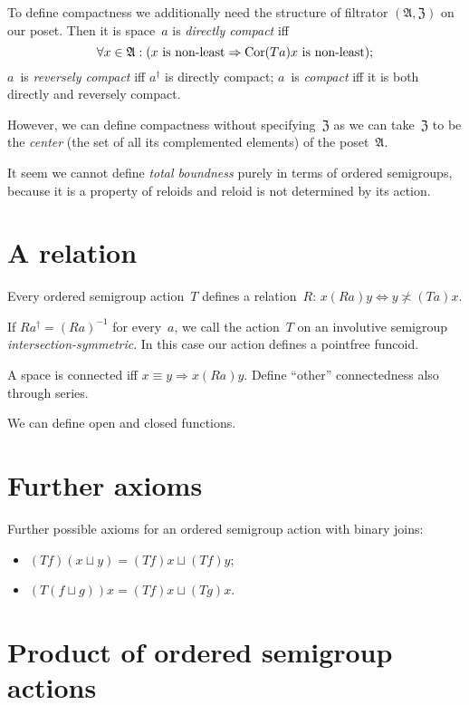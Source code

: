 To define compactness we additionally need the structure of filtrator $(\mathfrak{A},\mathfrak{Z})$ on our poset. Then it is space~$a$ is \emph{directly compact} iff
\[\forall x\in\mathfrak{A}:(x\text{ is non-least}\Rightarrow\operatorname{Cor}(Ta)x\text{ is non-least}); \]
$a$~is \emph{reversely compact} iff $a^{\dagger}$ is directly compact; $a$~is \emph{compact} iff it is both directly and reversely compact.

However, we can define compactness without specifying~$\mathfrak{Z}$ as we can take~$\mathfrak{Z}$ to be the \emph{center} (the set of all its complemented elements) of the poset~$\mathfrak{A}$.

It seem we cannot define \emph{total boundness} purely in terms of ordered semigroups, because it is a property of reloids and reloid is not determined by its action.

\section{A relation}

Every ordered semigroup action~$T$ defines a relation~$R$: $x(Ra)y\Leftrightarrow y\nasymp(Ta)x$.

If $Ra^{\dagger}=(Ra)^{-1}$ for every~$a$, we call the action~$T$ on an involutive semigroup \emph{inter\-sec\-tion-sym\-met\-ric}. In this case our action defines a pointfree funcoid.

A space is connected iff $x\equiv y\Rightarrow x(Ra)y$. Define ``other'' connectedness also through series.

We can define open and closed functions.

\section{Further axioms}

Further possible axioms for an ordered semigroup action with binary joins:

\begin{itemize}
\item $(Tf)(x\sqcup y)=(Tf)x\sqcup(Tf)y$;
\item $(T(f\sqcup g))x=(Tf)x\sqcup(Tg)x$.
\end{itemize}


\section{Product of ordered semigroup actions}


